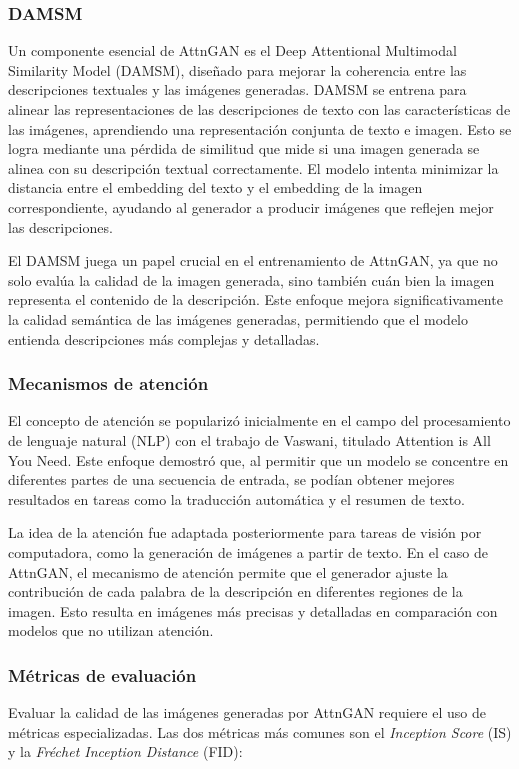 \subsubsection{DAMSM}
Un componente esencial de AttnGAN es el Deep Attentional Multimodal Similarity Model (DAMSM), diseñado para mejorar la coherencia entre las descripciones textuales y las imágenes generadas. DAMSM se entrena para alinear las representaciones de las descripciones de texto con las características de las imágenes, aprendiendo una representación conjunta de texto e imagen. Esto se logra mediante una pérdida de similitud que mide si una imagen generada se alinea con su descripción textual correctamente. El modelo intenta minimizar la distancia entre el embedding del texto y el embedding de la imagen correspondiente, ayudando al generador a producir imágenes que reflejen mejor las descripciones.

El DAMSM juega un papel crucial en el entrenamiento de AttnGAN, ya que no solo evalúa la calidad de la imagen generada, sino también cuán bien la imagen representa el contenido de la descripción. Este enfoque mejora significativamente la calidad semántica de las imágenes generadas, permitiendo que el modelo entienda descripciones más complejas y detalladas.

\subsubsection{Mecanismos de atención}
El concepto de atención se popularizó inicialmente en el campo del procesamiento de lenguaje natural (NLP) con el trabajo de Vaswani, titulado Attention is All You Need. Este enfoque demostró que, al permitir que un modelo se concentre en diferentes partes de una secuencia de entrada, se podían obtener mejores resultados en tareas como la traducción automática y el resumen de texto. \cite{vaswani2017attention}

La idea de la atención fue adaptada posteriormente para tareas de visión por computadora, como la generación de imágenes a partir de texto. En el caso de AttnGAN, el mecanismo de atención permite que el generador ajuste la contribución de cada palabra de la descripción en diferentes regiones de la imagen. Esto resulta en imágenes más precisas y detalladas en comparación con modelos que no utilizan atención.

\subsubsection{Métricas de evaluación}
Evaluar la calidad de las imágenes generadas por AttnGAN requiere el uso de métricas especializadas. Las dos métricas más comunes son el \textit{Inception Score} (IS) y la \textit{Fréchet Inception Distance} (FID):

